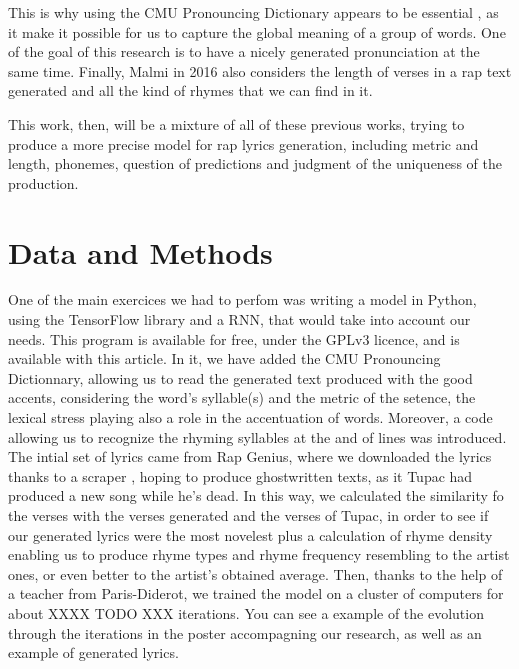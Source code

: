 \documentclass[12pt,a4paper]{article}
\begin{document}
This is why using the CMU Pronouncing Dictionary appears to be essential \cite{hirjee_using_2010}, as it make it possible for us to capture the global meaning of a group of words. One of the goal of this research is to have a nicely generated pronunciation at the same time. Finally, Malmi in 2016 also considers the length of verses in a rap text generated and all the kind of rhymes that we can find in it. \newline

This work, then, will be a mixture of all of these previous works, trying to produce a more precise model for rap lyrics generation, including metric and length, phonemes, question of predictions and judgment of the uniqueness of the production. \newline

\section{Data and Methods}

One of the main exercices we had to perfom was writing a model in Python, using the TensorFlow library and a RNN, that would take into account our needs.  This program is available for free, under the GPLv3 licence, and is available with this article. In it, we have added the CMU Pronouncing Dictionnary, allowing us to read the generated text produced with the good accents, considering the word's syllable(s) and the metric of the setence, the lexical stress playing also a role in the accentuation of words. Moreover, a code allowing us to recognize the rhyming syllables at the and of lines was introduced. The intial set of lyrics came from Rap Genius, where we downloaded the lyrics thanks to a scraper \cite{paupier_raplyrics-scraper_2018}, hoping to produce ghostwritten texts, as it Tupac had produced a new song while he's dead. In this way, we calculated the similarity fo the verses with the verses generated and the verses of Tupac, in order to see if our generated lyrics were the most novelest plus a calculation of rhyme density enabling us to produce rhyme types and rhyme frequency resembling to the artist ones, or even better to the artist’s obtained average. Then, thanks to the help of a teacher from Paris-Diderot, we trained the model on a cluster of computers for about XXXX TODO XXX iterations. You can see a example of the evolution through the iterations in the poster accompagning our research, as well as an example of generated lyrics.



\end{document}
